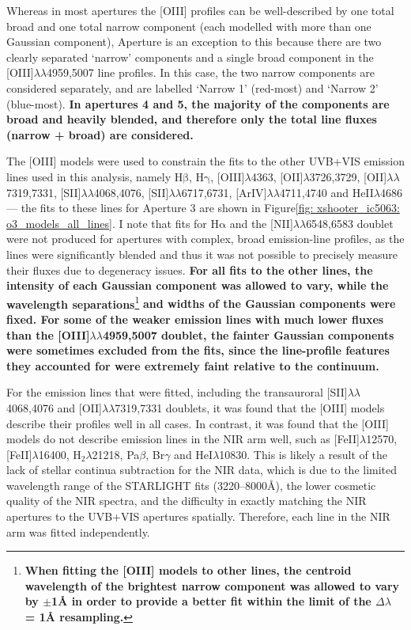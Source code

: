 Whereas in most apertures the [OIII] profiles can be well-described by one total broad and one total narrow component (each modelled with more than one Gaussian component), Aperture is an exception to this because there are two clearly separated `narrow' components and a single broad component in the [OIII]$\lambda\lambda$4959,5007 line profiles. In this case, the two narrow components are considered separately, and are labelled `Narrow 1' (red-most) and `Narrow 2' (blue-most). \textbf{In apertures 4 and 5, the majority of the components are broad and heavily blended, and therefore only the total line fluxes (narrow + broad) are considered.}

\vfill
\newpage

The [OIII] models were used to constrain the fits to the other UVB+VIS emission lines used in this analysis, namely H$\mathrm{\beta}$, H$\mathrm{\gamma}$, [OIII]$\lambda$4363, [OII]$\lambda$3726,3729, [OII]$\lambda\lambda$7319,7331, [SII]$\lambda\lambda$4068,4076, [SII]$\lambda\lambda$6717,6731, [ArIV]$\lambda\lambda$4711,4740 and HeII$\lambda$4686 --- the fits to these lines for Aperture 3 are shown in Figure\;\ref{fig: xshooter_ic5063: o3_models_all_lines}. I note that fits for H$\mathrm{\alpha}$ and the [NII]$\lambda\lambda$6548,6583 doublet were not produced for apertures with complex, broad emission-line profiles, as the lines were significantly blended and thus it was not possible to precisely measure their fluxes due to degeneracy issues. \textbf{For all fits to the other lines, the intensity of each Gaussian component was allowed to vary, while the wavelength separations}\footnote{\textbf{When fitting the [OIII] models to other lines, the centroid wavelength of the brightest narrow component was allowed to vary by $\pm$1{\;\AA} in order to provide a better fit within the limit of the $\Delta\lambda$ = 1{\;\AA} resampling.}} \textbf{and widths of the Gaussian components were fixed. For some of the weaker emission lines with much lower fluxes than the [OIII]$\lambda\lambda$4959,5007 doublet, the fainter Gaussian components were sometimes excluded from the fits, since the line-profile features they accounted for were extremely faint relative to the continuum.}

For the emission lines that were fitted, including the transauroral [SII]$\lambda\lambda$4068,4076 and [OII]$\lambda\lambda$7319,7331 doublets, it was found that the [OIII] models describe their profiles well in all cases. In contrast, it was found that the [OIII] models do not describe emission lines in the NIR arm well, such as [FeII]$\lambda$12570, [FeII]$\lambda$16400, H$_2 \lambda$21218, Pa$\beta$, Br$\gamma$ and HeI$\lambda$10830. This is likely a result of the lack of stellar continua subtraction for the NIR data, which is due to the limited wavelength range of the \textsc{STARLIGHT} fits (3220--8000\;\AA), the lower cosmetic quality of the NIR spectra, and the difficulty in exactly matching the NIR apertures to the UVB+VIS apertures spatially. Therefore, each line in the NIR arm was fitted independently. \\

